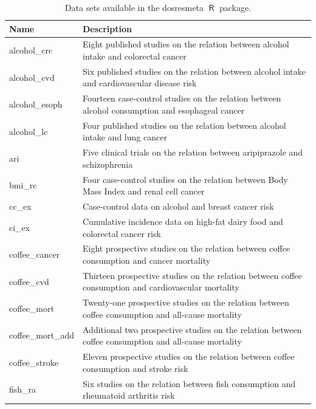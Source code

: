 \documentclass[11pt,a4paper,twoside,openany]{book}\usepackage{knitr}
\newcommand{\pkg}[1]{{\fontseries{b}\selectfont #1}}
\DeclareMathOperator{\R}{\textsf{R}}
\begin{document}
{{\begin{knitrout}
\begin{table}
\caption{\label{tab:data_table}Data sets available in the \pkg{dosresmeta} $\R$ package.}
\centering
\begin{tabular}[t]{l>{\raggedright\arraybackslash}p{32em}}
\toprule
Name & Description\\
\midrule
alcohol\_crc & Eight published studies on the relation between alcohol intake and colorectal cancer \citep{orsini2011meta}\\
alcohol\_cvd & Six published studies on the relation between alcohol intake and cardiovascular disease risk \citep{liu2009two}\\
alcohol\_esoph & Fourteen case-control studies on the relation between alcohol consumption and esophageal cancer \citep{rota2010random}\\
alcohol\_lc & Four published studies on the relation between alcohol intake and lung cancer \citep{orsini2011meta}\\
ari & Five clinical trials on the relation between aripiprazole and schizophrenia \citep{crippa2016dose}\\
\addlinespace
bmi\_rc & Four case-control studies on the relation between Body Mass Index and renal cell cancer \citep{liu2009two}\\
cc\_ex & Case-control data on alcohol and breast cancer risk \citep{greenland1992methods}\\
ci\_ex & Cumulative incidence data on high-fat dairy food and colorectal cancer risk \citep{orsini2006generalized}\\
coffee\_cancer & Eight prospective studies on the relation between coffee consumption and cancer mortality \citep{crippa2014coffee}\\
coffee\_cvd & Thirteen prospective studies on the relation between coffee consumption and cardiovascular mortality \citep{crippa2014coffee}\\
\addlinespace
coffee\_mort & Twenty-one prospective studies on the relation between coffee consumption and all-cause mortality \citep{crippa2014coffee}\\
coffee\_mort\_add & Additional two prospective studies on the relation between coffee consumption and all-cause mortality \citep{nilsson2012traditional}\\
coffee\_stroke & Eleven prospective studies on the relation between coffee consumption and stroke risk \citep{larsson2011coffee}\\
fish\_ra & Six studies on the relation between fish consumption and rheumatoid arthritis risk \citep{di2014fish}\\

\end{tabular}
\end{table}
\end{knitrout}}}
\end{document}
